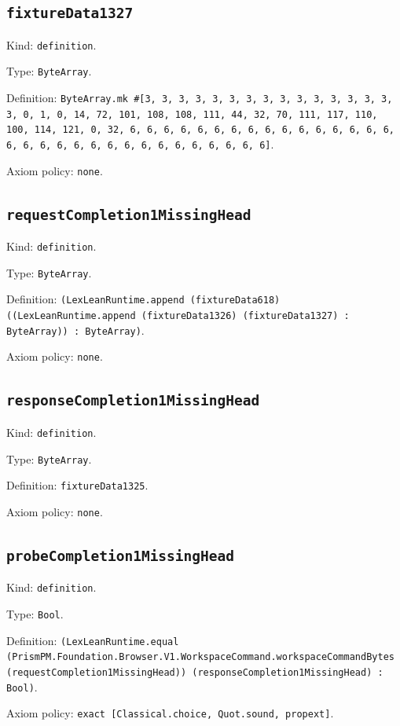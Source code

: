 \documentclass[11pt]{article}
\begin{document}
\subsection*{\texttt{fixtureData1327}}
\noindent Kind: \texttt{definition}.\par
\noindent Type: \texttt{ByteArray}.\par
\noindent Definition: \texttt{ByteArray.mk \#[3, 3, 3, 3, 3, 3, 3, 3, 3, 3, 3, 3, 3, 3, 3, 3, 0, 1, 0, 14, 72, 101, 108, 108, 111, 44, 32, 70, 111, 117, 110, 100, 114, 121, 0, 32, 6, 6, 6, 6, 6, 6, 6, 6, 6, 6, 6, 6, 6, 6, 6, 6, 6, 6, 6, 6, 6, 6, 6, 6, 6, 6, 6, 6, 6, 6, 6, 6]}.\par
\noindent Axiom policy: \texttt{none}.\par
\subsection*{\texttt{requestCompletion1MissingHead}}
\noindent Kind: \texttt{definition}.\par
\noindent Type: \texttt{ByteArray}.\par
\noindent Definition: \texttt{(LexLeanRuntime.append (fixtureData618) ((LexLeanRuntime.append (fixtureData1326) (fixtureData1327) : ByteArray)) : ByteArray)}.\par
\noindent Axiom policy: \texttt{none}.\par
\subsection*{\texttt{responseCompletion1MissingHead}}
\noindent Kind: \texttt{definition}.\par
\noindent Type: \texttt{ByteArray}.\par
\noindent Definition: \texttt{fixtureData1325}.\par
\noindent Axiom policy: \texttt{none}.\par
\subsection*{\texttt{probeCompletion1MissingHead}}
\noindent Kind: \texttt{definition}.\par
\noindent Type: \texttt{Bool}.\par
\noindent Definition: \texttt{(LexLeanRuntime.equal (PrismPM.Foundation.Browser.V1.WorkspaceCommand.workspaceCommandBytes (requestCompletion1MissingHead)) (responseCompletion1MissingHead) : Bool)}.\par
\noindent Axiom policy: \texttt{exact [Classical.choice, Quot.sound, propext]}.\par
\end{document}
